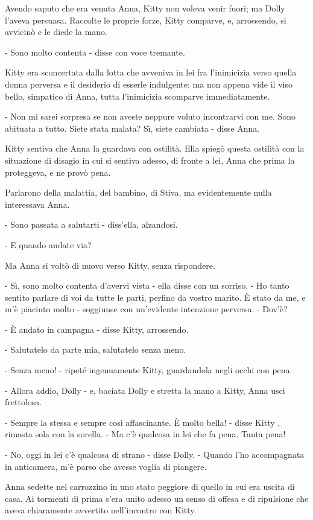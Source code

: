 Avendo saputo che era venuta Anna, Kitty non voleva venir fuori; ma Dolly l'aveva persuasa. Raccolte le proprie forze, Kitty comparve, e, arrossendo, si avvicinò e le diede la mano. 

- Sono molto contenta - disse con voce tremante. 

Kitty era sconcertata dalla lotta che avveniva in lei fra l'inimicizia verso quella donna perversa e il desiderio di esserle indulgente; ma non appena vide il viso bello, simpatico di Anna, tutta l'inimicizia scomparve immediatamente. 

- Non mi sarei sorpresa se non aveste neppure voluto incontrarvi con me. Sono abituata a tutto. Siete stata malata? Sì, siete cambiata - disse Anna. 

Kitty sentiva che Anna la guardava con ostilità. Ella spiegò questa ostilità con la situazione di disagio in cui si sentiva adesso, di fronte a lei, Anna che prima la proteggeva, e ne provò pena. 

Parlarono della malattia, del bambino, di Stiva, ma evidentemente nulla interessava Anna. 

- Sono passata a salutarti - diss'ella, alzandosi. 

- E quando andate via? 

Ma Anna si voltò di nuovo verso Kitty, senza rispondere. 

- Sì, sono molto contenta d'avervi vista - ella disse con un sorriso. - Ho tanto sentito parlare di voi da tutte le parti, perfino da vostro marito. È stato da me, e m'è piaciuto molto - soggiunse con un'evidente intenzione perversa. - Dov'è? 

- È andato in campagna - disse Kitty, arrossendo. 

- Salutatelo da parte mia, salutatelo senza meno. 

- Senza meno! - ripeté ingenuamente Kitty, guardandola negli occhi con pena. 

- Allora addio, Dolly - e, baciata Dolly e stretta la mano a Kitty, Anna uscì frettolosa. 

- Sempre la stessa e sempre così affascinante. È molto bella! - disse Kitty , rimasta sola con la sorella. - Ma c'è qualcosa in lei che fa pena. Tanta pena! 

- No, oggi in lei c'è qualcosa di strano - disse Dolly. - Quando l'ho accompagnata in anticamera, m'è parso che avesse voglia di piangere. 

Anna sedette nel carrozzino in uno stato peggiore di quello in cui era uscita di casa. Ai tormenti di prima s'era unito adesso un senso di offesa e di ripulsione che aveva chiaramente avvertito nell'incontro con Kitty. 

